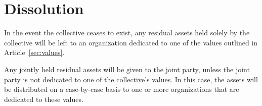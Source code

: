 \chapter{Dissolution}\label{sec:dissolution}
In the event the collective ceases to exist, any residual assets held solely by the collective will be left to an organization dedicated to one of the values outlined in Article~\ref{sec:values}.

Any jointly held residual assets will be given to the joint party, unless the joint party is not dedicated to one of the collective's values. In this case, the assets will be distributed on a case-by-case basis to one or more organizations that are dedicated to these values.
